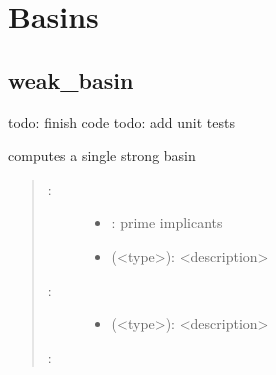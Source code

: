 \documentclass[letterpaper,10pt,english]{sphinxmanual}
\begin{document}
\section{Basins}
\label{\detokenize{Basins:basins}}\label{\detokenize{Basins::doc}}\label{\detokenize{Basins:id1}}

\subsection{weak\_basin}
\label{\detokenize{Basins:weak-basins}}\label{\detokenize{Basins:weak-basin}}

\begin{fulllineitems}
\label{\detokenize{Basins:PyBoolNet.Basins.weak_basin}}
todo: finish code
todo: add unit tests

computes a single strong basin
\begin{quote}
\begin{description}
\item[{:}] \leavevmode\begin{itemize}
\item {} 
: prime implicants

\item {} 
 (\textless{}type\textgreater{}): \textless{}description\textgreater{}

\end{itemize}

\item[{:}] \leavevmode\begin{itemize}
\item {} 
 (\textless{}type\textgreater{}): \textless{}description\textgreater{}

\end{itemize}

\end{description}

:

\begin{sphinxVerbatim}[commandchars=\\\{\}]
\end{sphinxVerbatim}
\end{quote}

\end{fulllineitems}
\end{document}
